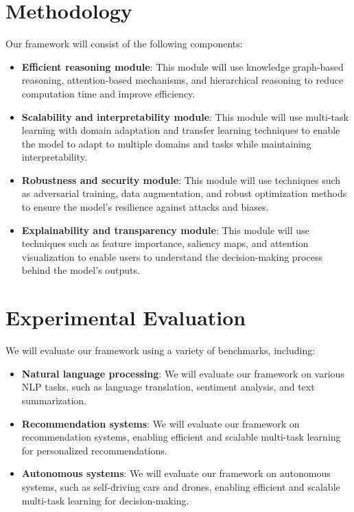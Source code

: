 \documentclass{article}
\begin{document}
\section{Methodology}

Our framework will consist of the following components:

\begin{itemize}
\item \textbf{Efficient reasoning module}: This module will use knowledge graph-based reasoning, attention-based mechanisms, and hierarchical reasoning to reduce computation time and improve efficiency.
\item \textbf{Scalability and interpretability module}: This module will use multi-task learning with domain adaptation and transfer learning techniques to enable the model to adapt to multiple domains and tasks while maintaining interpretability.
\item \textbf{Robustness and security module}: This module will use techniques such as adversarial training, data augmentation, and robust optimization methods to ensure the model's resilience against attacks and biases.
\item \textbf{Explainability and transparency module}: This module will use techniques such as feature importance, saliency maps, and attention visualization to enable users to understand the decision-making process behind the model's outputs.
\end{itemize}

\section{Experimental Evaluation}

We will evaluate our framework using a variety of benchmarks, including:

\begin{itemize}
\item \textbf{Natural language processing}: We will evaluate our framework on various NLP tasks, such as language translation, sentiment analysis, and text summarization.
\item \textbf{Recommendation systems}: We will evaluate our framework on recommendation systems, enabling efficient and scalable multi-task learning for personalized recommendations.
\item \textbf{Autonomous systems}: We will evaluate our framework on autonomous systems, such as self-driving cars and drones, enabling efficient and scalable multi-task learning for decision-making.
\end{itemize}
\end{document}
